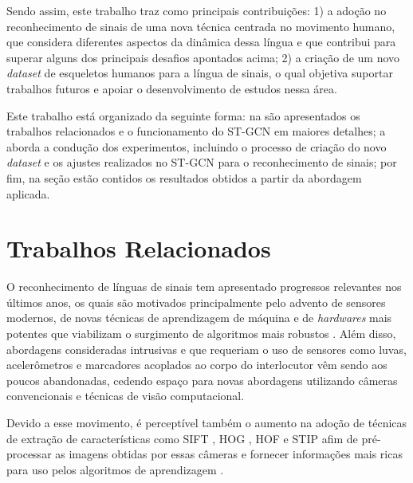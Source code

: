 Sendo assim, este trabalho traz como principais contribuições: 1) a adoção no reconhecimento de sinais de uma nova técnica centrada no movimento humano, que considera diferentes aspectos da dinâmica dessa língua e que contribui para superar alguns dos principais desafios apontados acima; 2) a criação de um novo \textit{dataset} de esqueletos humanos para a língua de sinais, o qual objetiva suportar trabalhos futuros e apoiar o desenvolvimento de estudos nessa área.

Este trabalho está organizado da seguinte forma: na  são apresentados os trabalhos relacionados e o funcionamento do ST-GCN em maiores detalhes; a  aborda a condução dos experimentos, incluindo o processo de criação do novo \textit{dataset} e os ajustes realizados no ST-GCN para o reconhecimento de sinais; por fim, na seção  estão contidos os resultados obtidos a partir da abordagem aplicada.



\section{Trabalhos Relacionados} %
\label{sec:trabalhos-relacionados}

O reconhecimento de línguas de sinais tem apresentado progressos relevantes nos últimos anos, os quais são motivados principalmente pelo advento de sensores modernos, de novas técnicas de aprendizagem de máquina e de \textit{hardwares} mais potentes que viabilizam o surgimento de algoritmos mais robustos \cite{recent-advances-dl-2017, recent-advances-sl-2013}. Além disso, abordagens consideradas intrusivas e que requeriam o uso de sensores como luvas, acelerômetros e marcadores acoplados ao corpo do interlocutor vêm sendo aos poucos abandonadas, cedendo espaço para novas abordagens utilizando câmeras convencionais e técnicas de visão computacional. 

Devido a esse movimento, é perceptível também o aumento na adoção de técnicas de extração de características como SIFT \cite{lowe-2004}, HOG \cite{dalal-2005}, HOF \cite{laptev-2008} e STIP \cite{laptev-2008} \cite{recent-advances-dl-2017} afim de pré-processar as imagens obtidas por essas câmeras e fornecer informações mais ricas para uso pelos algoritmos de aprendizagem \cite{lim-2016, shanta-2018}.


